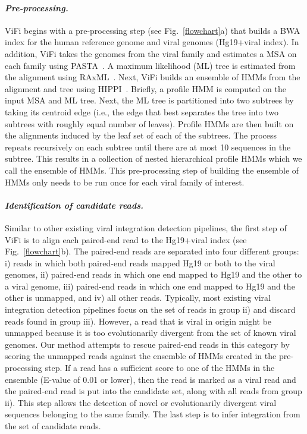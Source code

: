 \documentclass[10pt]{article}
\begin{document}
\paragraph{\emph{Pre-processing.}} ViFi begins with a pre-processing step (see Fig.~\ref{flowchart}a) that builds a BWA index for the human reference genome and viral genomes (Hg19+viral index).  In addition, ViFi takes the genomes from the viral family and estimates a MSA on each family using PASTA~\cite{Mirarab2014}.  A maximum likelihood (ML) tree is estimated from the alignment using RAxML~\cite{Stamatakis2014}.  Next, ViFi builds an ensemble of HMMs from the alignment and tree using HIPPI~\cite{Nguyen2016_hippi}.  Briefly, a profile HMM is computed on the input MSA and ML tree.  Next, the ML tree is partitioned into two subtrees by taking its centroid edge (i.e., the edge that best separates the tree into two subtrees with roughly equal number of leaves).  Profile HMMs are then built on the alignments induced by the leaf set of each of the subtrees.  The process repeats recursively on each subtree until there are at most 10 sequences in the subtree.  This results in a collection of nested hierarchical profile HMMs which we call the ensemble of HMMs.  This pre-processing step of building the ensemble of HMMs only needs to be run once for each viral family of interest.

\paragraph{\emph{Identification of candidate reads.}} Similar to other existing viral integration detection pipelines, the first step of ViFi is to align each paired-end read to the Hg19+viral index (see Fig.~\ref{flowchart}b).  The paired-end reads are separated into four different groups: i) reads in which both paired-end reads mapped Hg19 or both to the viral genomes, ii) paired-end reads in which one end mapped to Hg19 and the other to a viral genome, iii) paired-end reads in which one end mapped to Hg19 and the other is unmapped, and iv) all other reads.  Typically, most existing viral integration detection pipelines focus on the set of reads in group ii) and discard reads found in group iii).  However, a read that is viral in origin might be unmapped because it is too evolutionarily divergent from the set of known viral genomes.  Our method attempts to rescue paired-end reads in this category by scoring the unmapped reads against the ensemble of HMMs created in the pre-processing step.  If a read has a sufficient score to one of the HMMs in the ensemble (E-value of 0.01 or lower), then the read is marked as a viral read and the paired-end read is put into the candidate set, along with all reads from group ii).  This step allows the detection of novel or evolutionarily divergent viral sequences belonging to the same family.  The last step is to infer integration from the set of candidate reads.  
\end{document}
